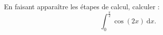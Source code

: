 \medskip

En faisant apparaître les étapes de calcul, calculer :
\[\displaystyle\int_0^{\frac{\pi}{2}} \cos (2x) \:\text{d}x.\]
